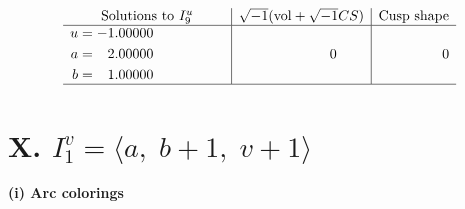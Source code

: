 \documentclass[1p]{elsarticle_modified}
\theoremstyle{definition}
\newcommand{\I}{\sqrt{-1}}
\begin{document}
$$\begin{array}{c|c|c}  
\text{Solutions to }I^u_{9}& \I (\text{vol} + \sqrt{-1}CS) & \text{Cusp shape}\\
 \hline 
\begin{aligned}
u &= -1.00000\phantom{ +0.000000I} \\
a &= \phantom{-}2.00000\phantom{ +0.000000I} \\
b &= \phantom{-}1.00000\phantom{ +0.000000I}\end{aligned}
 & \phantom{-0.000000 } 0 & \phantom{-0.000000 } 0\\
 \hline 
 \end{array}$$\newpage\newpage\renewcommand{\arraystretch}{1}
\centering \section*{X. $I^v_{1}= \langle a,\;b+1,\;v+1 \rangle$}
\flushleft \textbf{(i) Arc colorings}\\
\end{document}
